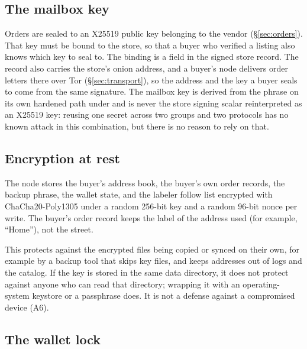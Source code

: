 \subsection{The mailbox key}

Orders are sealed to an X25519 public key belonging to the vendor (\S\ref{sec:orders}). That key must be bound to the store, so that a buyer who verified a listing also knows which key to seal to. The binding is a field in the signed store record. The record also carries the store's onion address, and a buyer's node delivers order letters there over Tor (\S\ref{sec:transport}), so the address and the key a buyer seals to come from the same signature. The mailbox key is derived from the phrase on its own hardened path under  and is never the store signing scalar reinterpreted as an X25519 key: reusing one secret across two groups and two protocols has no known attack in this combination, but there is no reason to rely on that.

\subsection{Encryption at rest}

The node stores the buyer's address book, the buyer's own order records, the backup phrase, the wallet state, and the labeler follow list encrypted with ChaCha20-Poly1305 under a random 256-bit key and a random 96-bit nonce per write. The buyer's order record keeps the label of the address used (for example, ``Home''), not the street.

This protects against the encrypted files being copied or synced on their own, for example by a backup tool that skips key files, and keeps addresses out of logs and the catalog. If the key is stored in the same data directory, it does not protect against anyone who can read that directory; wrapping it with an operating-system keystore or a passphrase does. It is not a defense against a compromised device (A6).

\subsection{The wallet lock}
\label{sec:wallet-lock}


